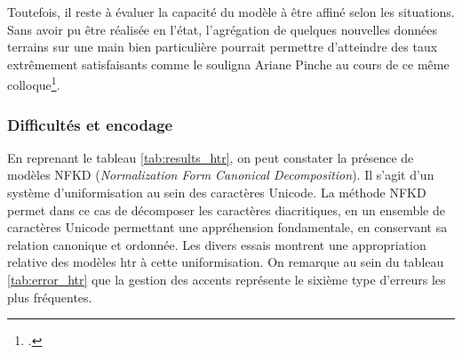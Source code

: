     Toutefois, il reste à évaluer la capacité du modèle à être affiné selon les situations. Sans avoir pu être réalisée en l'état, l'agrégation de quelques nouvelles données terrains sur une main bien particulière pourrait permettre d'atteindre des taux extrêmement satisfaisants comme le souligna Ariane Pinche au cours de ce même colloque\footcite{pincheSegmOntoControlledVocabulary2022a}.
	
	\subsubsection{Difficultés et encodage}
	
	En reprenant le tableau \ref{tab:results_htr}, on peut constater la présence de modèles NFKD (\textit{Normalization Form Canonical Decomposition}). Il s'agit d'un système d'uniformisation au sein des caractères Unicode. La méthode NFKD permet dans ce cas de décomposer les caractères diacritiques, en un ensemble de caractères Unicode permettant une appréhension fondamentale, en conservant sa relation canonique et ordonnée. Les divers essais montrent une appropriation relative des modèles \gls{htr} à cette uniformisation. On remarque au sein du tableau \ref{tab:error_htr} que la gestion des accents représente le sixième type d'erreurs les plus fréquentes.
	
	\begin{table}
    \centering
    \caption{Les 7 erreurs les plus courantes du modèle ArMcFR}
    \label{tab:error_htr}
    \end{table}
    
